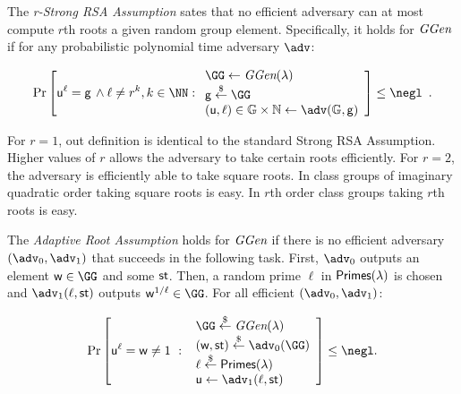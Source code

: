 \begin{assumption}


\label{assum:strongRSA}
The \emph{r-Strong RSA Assumption} sates that no efficient adversary can at most compute $r$th roots a given random group element. Specifically, it holds for $\textit{GGen}$ if for any probabilistic polynomial time adversary $\adv$:
\begin{small}
\[
    \Pr\left[\gr{u}^\ell = \gr{g} \,\wedge \ell \neq r^k, k \in \NN:
    \begin{array}{l}
         \GG \leftarrow \ggen(\lambda)  \\
         \gr{g} \sample \GG \\
         (\gr{u}, \ell) \in \mathbb{G} \times \mathbb{N} \leftarrow \adv(\mathbb{G}, \gr{g}) \\
    \end{array}\right] \leq \negl \enspace .
\]
\end{small}
\end{assumption} 
For $r=1$, out definition is identical to the standard Strong RSA Assumption. Higher values of $r$ allows the adversary to take certain roots efficiently. For $r=2$, the adversary is efficiently able to take square roots. In class groups of imaginary quadratic order taking square roots is easy. In $r$th order class groups taking $r$th roots is easy.
\begin{assumption}
\label{assum:adaptiveroot}
The \emph{Adaptive Root Assumption} holds for $\textit{GGen}$ if 
there is no efficient adversary $(\adv_0,\adv_1)$ that succeeds 
in the following task.
First, $\adv_0$ outputs an element $\gr{w} \in \GG$ and some $\textsf{st}$.
Then, a random prime $\ell$ in $\textsf{Primes}(\lambda)$ is chosen
and $\adv_1(\ell,\state)$ outputs $\gr{w}^{1/\ell} \in \GG$.
For all efficient $(\adv_0,\adv_1)$:
\begin{small}
\[           
                \Pr\left[\gr{u}^\ell = \gr{w} \neq 1 \ : \ 
                \begin{array}{l}
                      \GG \sample \ggen(\lambda) \\ 
                      (\gr{w},\state) \sample \adv_0(\GG) \\
                      \ell \sample \primes \\ 
                      \gr{u} \gets \adv_1(\ell, \state)
                \end{array} 
        \right] \leq \negl.
\]
\end{small}
\end{assumption}

